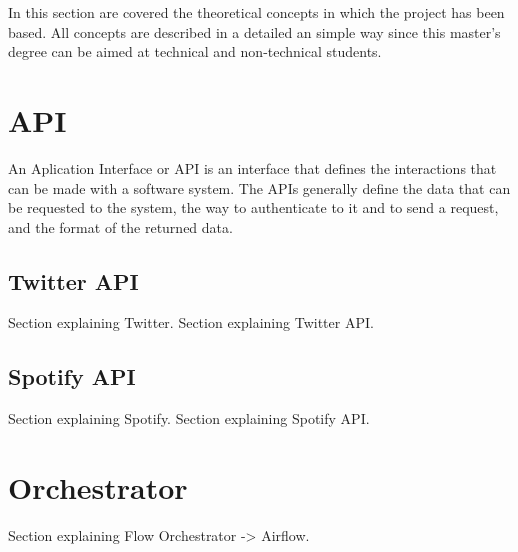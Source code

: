 

\nonzeroparskip In this section are covered the theoretical concepts in which the project has been based. All concepts are described in a detailed an simple way since this master's degree can be aimed at technical and non-technical students.

\section{API}

\nonzeroparskip An Aplication Interface or API is an interface that defines the interactions that can be made with a software system. The APIs generally define the data that can be requested to the system, the way to authenticate to it and to send a request, and the format of the returned data.

\subsection{Twitter API}
\nonzeroparskip Section explaining Twitter.
\nonzeroparskip Section explaining Twitter API.

\subsection{Spotify API}
\nonzeroparskip Section explaining Spotify.
\nonzeroparskip Section explaining Spotify API.

\section{Orchestrator}

\nonzeroparskip Section explaining Flow Orchestrator -> Airflow.

